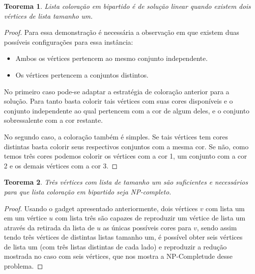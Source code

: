 \documentclass[9pt, compress]{beamer}
\newtheorem{teorema}{Teorema}
\newcommand{\?}{\textcolor{warn}{\textit{?}}}
\begin{document}
       \begin{frame}
       \begin{teorema}
       Lista coloração em bipartido é de solução linear quando existem dois vértices de lista tamanho um.
       \end{teorema}
       \begin{proof}
        Para essa demonstração é necessária a observação em que existem duas possíveis configurações para essa instância:
        \begin{itemize}
          \item Ambos os vértices pertencem ao mesmo conjunto independente.
          \item Os vértices pertencem a conjuntos distintos.
        \end{itemize} 
        No primeiro caso pode-se adaptar a estratégia de coloração anterior para a solução. Para tanto basta colorir tais vértices com suas cores disponíveis e o conjunto independente ao qual pertencem com a cor de algum deles, e o conjunto sobressalente com a cor restante.
 
        No segundo caso, a coloração também é simples. Se tais vértices tem cores distintas basta colorir seus respectivos conjuntos com a mesma cor. Se não, como temos três cores podemos colorir os vértices com a cor 1, um conjunto com a cor 2 e os demais vértices com a cor 3.
       \end{proof}
     \end{frame}
     \begin{frame}
       \begin{teorema}
         Três vértices com lista de tamanho um são suficientes e necessários para que lista coloração em bipartido seja NP-completo.
       \end{teorema}
       \begin{proof}
        Usando o gadget apresentado anteriormente, dois vértices $v$ com lista um em um vértice $u$ com lista três são capazes de reproduzir um vértice de lista um através da retirada da lista de $u$ as únicas possíveis cores para $v$, sendo assim tendo três vértices de distintas listas tamanho um, é possível obter seis vértices de lista um (com três listas distintas de cada lado) e reproduzir a redução mostrada no caso com seis vértices, que nos mostra a NP-Completude desse problema.
       \end{proof}
     \end{frame}
\end{document}
